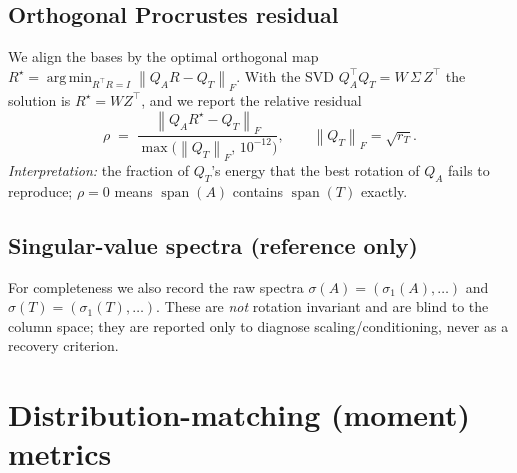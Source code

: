 \documentclass[11pt]{article}
\newcommand{\norm}[1]{\left\lVert #1 \right\rVert}
\newcommand{\fro}[1]{\norm{#1}_{F}}
\newcommand{\T}{^{\!\top}}
\newcommand{\range}{\operatorname{span}}
\DeclareMathOperator*{\argmin}{arg\,min}
\begin{document}
\subsection{Orthogonal Procrustes residual}
We align the bases by the optimal orthogonal map
$R^\star = \argmin_{R\T R = I}\fro{Q_A R - Q_T}$. With the SVD
$Q_A\T Q_T = W\,\Sigma\,Z\T$ the solution is $R^\star = W Z\T$, and we report the
relative residual
\begin{equation}
  \rho \;=\; \frac{\fro{Q_A R^\star - Q_T}}{\max\bigl(\fro{Q_T},\,10^{-12}\bigr)},
  \qquad \fro{Q_T}=\sqrt{r_T}.
  \label{eq:procrustes}
\end{equation}
\emph{Interpretation:} the fraction of $Q_T$'s energy that the best rotation of
$Q_A$ fails to reproduce; $\rho=0$ means $\range(A)$ contains $\range(T)$ exactly.

\subsection{Singular-value spectra (reference only)}
For completeness we also record the raw spectra
$\sigma(A)=(\sigma_1(A),\dots)$ and $\sigma(T)=(\sigma_1(T),\dots)$.
These are \emph{not} rotation invariant and are blind to the column space; they are
reported only to diagnose scaling/conditioning, never as a recovery criterion.

\section{Distribution-matching (moment) metrics}
\label{sec:moments}
\end{document}
